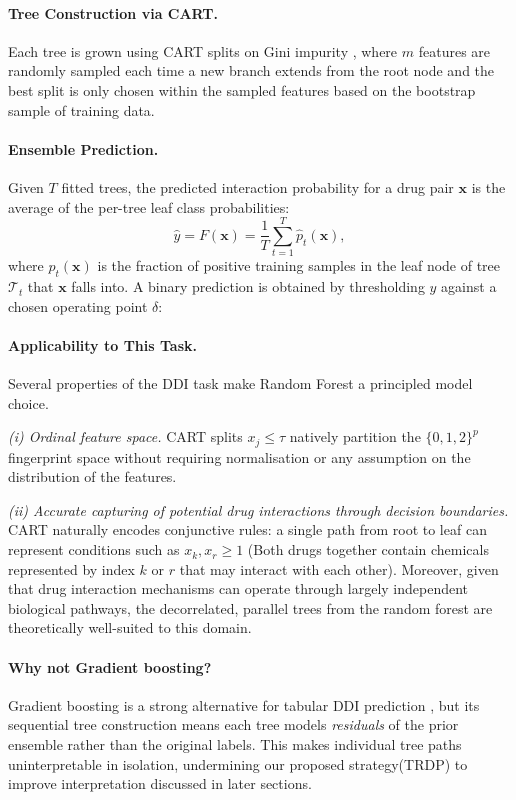 \documentclass[letterpaper]{article} %
\begin{document}
\paragraph{Tree Construction via CART.}
Each tree is grown using CART splits on Gini impurity \cite{Breiman1984}, where $m$ features are randomly sampled each time a new branch extends from the root node and the best split is only chosen within the sampled features based on the bootstrap sample of training data.

\paragraph{Ensemble Prediction.}
Given $T$ fitted trees, the predicted interaction probability for a drug pair $\mathbf{x}$ is the average of the per-tree leaf class probabilities:
\begin{equation}
    \hat{y} = F(\mathbf{x}) = \frac{1}{T} \sum_{t=1}^{T} \hat{p}_t(\mathbf{x}),
    \label{eq:rf_pred}
\end{equation}
where $\hat{p}_t(\mathbf{x})$ is the fraction of positive training samples in the leaf node of tree $\mathcal{T}_t$ that $\mathbf{x}$ falls into. A binary prediction is obtained by thresholding $\hat{y}$ against a chosen operating point $\delta$:

\paragraph{Applicability to This Task.}
Several properties of the DDI task make Random Forest a principled model choice.
 
\textit{(i) Ordinal feature space.} CART splits $x_j \leq \tau$ natively partition the $\{0,1,2\}^p$ fingerprint space without requiring normalisation or any assumption on the distribution of the features.

\textit{(ii) Accurate capturing of potential drug interactions through decision boundaries.} CART naturally encodes conjunctive rules: a single path from root to leaf can represent conditions such as  $x_k, x_r \geq 1$ (Both drugs together contain chemicals represented by index $k$ or $r$ that may interact with each other). Moreover, given that drug interaction mechanisms can operate through largely independent biological pathways, the decorrelated, parallel trees from the random forest are theoretically well-suited to this domain.


\paragraph{Why not Gradient boosting?}
Gradient boosting is a strong alternative for tabular DDI prediction \cite{Ryu2018}, but its sequential tree construction means each tree models \emph{residuals} of the prior ensemble rather than the original labels. This makes individual tree paths uninterpretable in isolation, undermining our proposed strategy(TRDP) to improve interpretation discussed in later sections.
\end{document}
